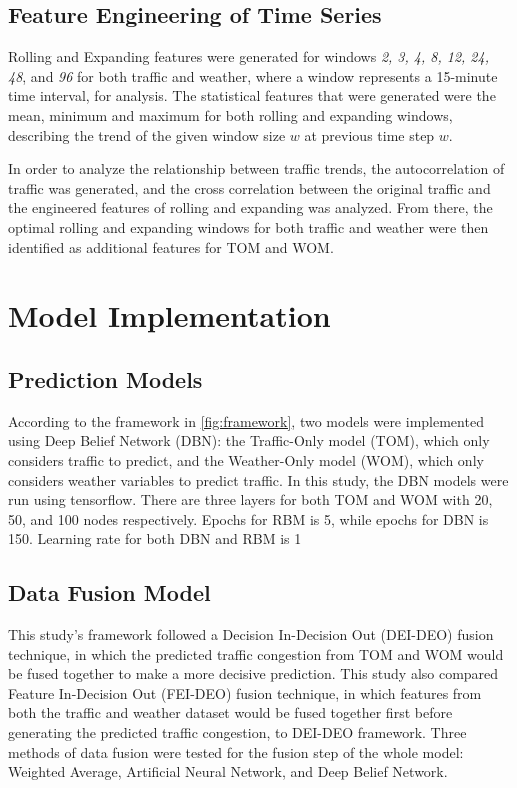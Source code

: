 \subsection{Feature Engineering of Time Series}
Rolling and Expanding features were generated for windows \textit{2, 3, 4, 8, 12, 24, 48}, and \textit{96} for both traffic and weather, where a window represents a 15-minute time interval, for analysis. The statistical features that were generated were the mean, minimum and maximum for both rolling and expanding windows, describing the trend of the given window size $w$ at previous time step $w$.

In order to analyze the relationship between traffic trends, the autocorrelation of traffic was generated, and the cross correlation between the original traffic and the engineered features of rolling and expanding was analyzed. From there, the optimal rolling and expanding windows for both traffic and weather were then identified as additional features for TOM and WOM. 



\section{Model Implementation}

\subsection{Prediction Models}
According to the framework in \ref{fig:framework}, two models were implemented using Deep Belief Network (DBN): the Traffic-Only model (TOM), which only considers traffic to predict, and the Weather-Only model (WOM), which only considers weather variables to predict traffic. In this study, the DBN models were run using tensorflow.  There are three layers for both TOM and WOM with 20, 50, and 100 nodes respectively. Epochs for RBM is 5, while epochs for DBN is 150. Learning rate for both DBN and RBM is 1%


\subsection{Data Fusion Model}
This study’s framework followed a Decision In-Decision Out (DEI-DEO) fusion technique, in which the predicted traffic congestion from TOM and WOM would be fused together to make a more decisive prediction. This study also compared Feature In-Decision Out (FEI-DEO) fusion technique, in which features from both the traffic and weather dataset would be fused together first before generating the predicted traffic congestion, to DEI-DEO framework. Three methods of data fusion were tested for the fusion step of the whole model: Weighted Average, Artificial Neural Network, and Deep Belief Network. 

